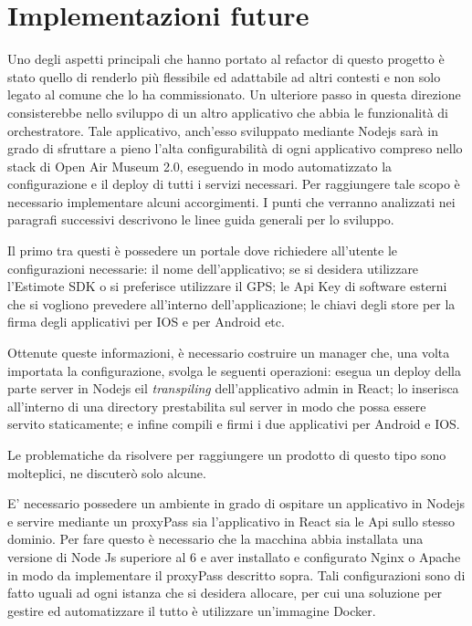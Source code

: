 \chapter{Implementazioni future}
\label{cha:intro}
\vspace{5mm}

Uno degli aspetti principali che hanno portato al refactor di questo progetto è stato quello di renderlo più flessibile ed adattabile ad altri contesti e non solo legato al comune che lo ha commissionato. Un ulteriore passo in questa direzione consisterebbe nello sviluppo di un altro applicativo che abbia le funzionalità di orchestratore. Tale applicativo, anch'esso sviluppato mediante Nodejs sarà in grado di sfruttare a pieno l’alta configurabilità di ogni applicativo compreso nello stack di Open Air Museum 2.0, eseguendo in modo automatizzato la configurazione e il deploy di tutti i servizi necessari. Per raggiungere tale scopo è necessario implementare alcuni accorgimenti. I punti che verranno analizzati nei paragrafi successivi descrivono le linee guida generali per lo sviluppo.\vspace{5mm}

Il primo tra questi è possedere un portale dove richiedere all’utente le configurazioni necessarie: il nome dell’applicativo; se si desidera utilizzare l’Estimote SDK o si preferisce utilizzare il GPS; le Api Key di software esterni che si vogliono prevedere all'interno dell'applicazione; le chiavi degli store per la firma degli applicativi per IOS e per Android etc.\vspace{5mm}

Ottenute queste informazioni, è necessario costruire un manager che, una volta importata la configurazione, svolga le seguenti operazioni: esegua un deploy della parte server in Nodejs eil \emph{transpiling} dell'applicativo admin in React; lo inserisca all’interno di una directory prestabilita sul server in modo che possa essere servito staticamente; e infine compili e firmi i due applicativi per Android e IOS. \vspace{5mm}

Le problematiche da risolvere per raggiungere un prodotto di questo tipo sono molteplici, ne discuterò solo alcune.\vspace{5mm}

E’ necessario possedere un ambiente in grado di ospitare un applicativo in Nodejs e servire mediante un proxyPass sia l’applicativo in React sia le Api sullo stesso dominio. Per fare questo è necessario che la macchina abbia installata una versione di Node Js superiore al 6 e aver installato e configurato Nginx o Apache in modo da implementare il proxyPass descritto sopra. Tali configurazioni sono di fatto uguali ad ogni istanza che si desidera allocare, per cui una soluzione per gestire ed automatizzare il tutto è utilizzare un'immagine Docker.\vspace{5mm}

